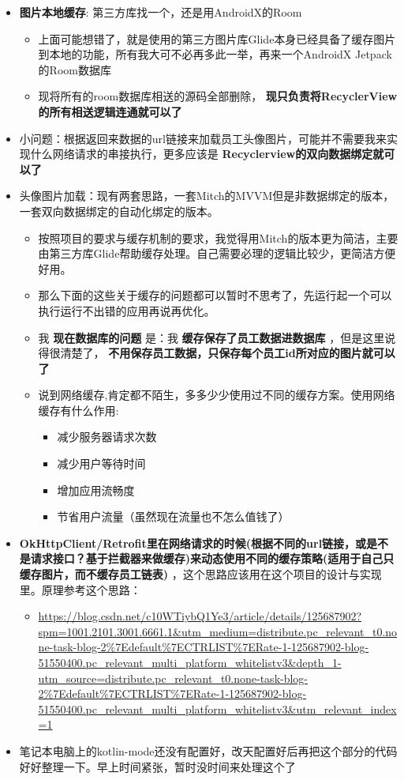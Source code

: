 \documentclass[9pt, b5paper]{article}
\begin{document}
\begin{itemize}
\item \textbf{图片本地缓存}: 第三方库找一个，还是用AndroidX的Room
\begin{itemize}
\item 上面可能想错了，就是使用的第三方图片库Glide本身已经具备了缓存图片到本地的功能，所有我大可不必再多此一举，再来一个AndroidX Jetpack的Room数据库
\item 现将所有的room数据库相送的源码全部删除， \textbf{现只负责将RecyclerView的所有相送逻辑连通就可以了}
\end{itemize}
\item 小问题：根据返回来数据的url链接来加载员工头像图片，可能并不需要我来实现什么网络请求的串接执行，更多应该是 \textbf{Recyclerview的双向数据绑定就可以了}
\item 头像图片加载：现有两套思路，一套Mitch的MVVM但是非数据绑定的版本，一套双向数据绑定的自动化绑定的版本。
\begin{itemize}
\item 按照项目的要求与缓存机制的要求，我觉得用Mitch的版本更为简洁，主要由第三方库Glide帮助缓存处理。自己需要必理的逻辑比较少，更简洁方便好用。
\item 那么下面的这些关于缓存的问题都可以暂时不思考了，先运行起一个可以执行运行不出错的应用再说再优化。
\item 我 \textbf{现在数据库的问题} 是：我 \textbf{缓存保存了员工数据进数据库} ，但是这里说得很清楚了， \textbf{不用保存员工数据，只保存每个员工id所对应的图片就可以了}
\item 说到网络缓存,肯定都不陌生，多多少少使用过不同的缓存方案。使用网络缓存有什么作用:
\begin{itemize}
\item 减少服务器请求次数
\item 减少用户等待时间
\item 增加应用流畅度
\item 节省用户流量（虽然现在流量也不怎么值钱了）
\end{itemize}
\end{itemize}
\item \textbf{OkHttpClient/Retrofit里在网络请求的时候(根据不同的url链接，或是不是请求接口？基于拦截器来做缓存)来动态使用不同的缓存策略(适用于自己只缓存图片，而不缓存员工链表)} ，这个思路应该用在这个项目的设计与实现里。原理参考这个思路： 
\begin{itemize}
\item \url{https://blog.csdn.net/c10WTiybQ1Ye3/article/details/125687902?spm=1001.2101.3001.6661.1&utm_medium=distribute.pc_relevant_t0.none-task-blog-2\%7Edefault\%7ECTRLIST\%7ERate-1-125687902-blog-51550400.pc_relevant_multi_platform_whitelistv3&depth_1-utm_source=distribute.pc_relevant_t0.none-task-blog-2\%7Edefault\%7ECTRLIST\%7ERate-1-125687902-blog-51550400.pc_relevant_multi_platform_whitelistv3&utm_relevant_index=1}
\end{itemize}
\item 笔记本电脑上的kotlin-mode还没有配置好，改天配置好后再把这个部分的代码好好整理一下。早上时间紧张，暂时没时间来处理这个了
\end{itemize}
\end{document}
